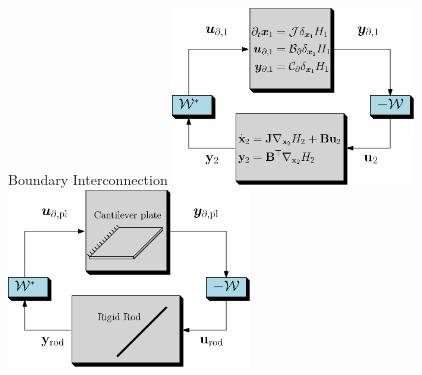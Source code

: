 \documentclass[aspectratio=169]{ISAE-Beamer}
\begin{document}
\begin{frame}{Boundary Interconnection}
\centering 
\includegraphics[width=0.48\textwidth]{KP/pp_interconnection.eps}
\hspace{5pt}
\includegraphics[width=0.48\textwidth]{pp_interconnection_platerod.eps}
\end{frame}
\end{document}

